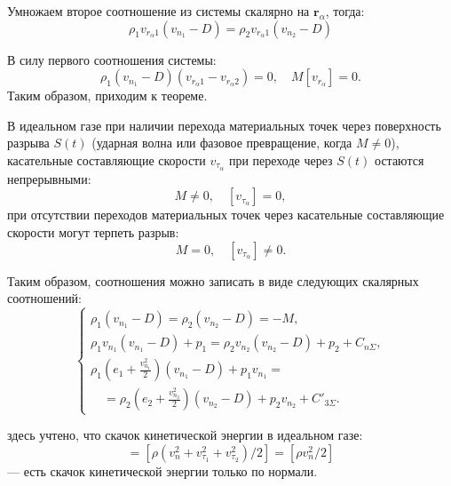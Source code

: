 Умножаем второе соотношение из системы скалярно на $\mathbf{r}_{\alpha}$, тогда:
\begin{equation*}
	\rho_1 v_{r_\alpha 1} \left(v_{n_1} - D\right) = \rho_2 v_{r_{\alpha} 1} \left(v_{n_2} - D\right)
\end{equation*}

В силу первого соотношения системы:
\begin{equation*}
	\rho_1 \left(v_{n_1} - D\right)\left(v_{r_\alpha 1} - v_{r_\alpha 2}\right) = 0, \quad M[v_{r_\alpha}] = 0.
\end{equation*}
Таким образом, приходим к теореме.

\begin{theorem}
	В идеальном газе при наличии перехода материальных точек через поверхность разрыва $S(t)$ (ударная волна или фазовое превращение, когда $M \not = 0$), касательные составляющие скорости $v_{\tau_\alpha}$ при переходе через $S(t)$ остаются непрерывными:
	\begin{equation*}
		M \not = 0, \quad [v_{\tau_\alpha}] = 0,
	\end{equation*}
	при отсутствии переходов материальных точек через касательные составляющие скорости могут терпеть разрыв:
	\begin{equation*}
		M = 0, \quad [v_{\tau_\alpha}] \not = 0.
	\end{equation*}
\end{theorem}

Таким образом, соотношения можно записать в виде следующих скалярных соотношений:
\begin{equation}
	\begin{cases}
		\rho_1 \left(v_{n_1} - D\right) = \rho_2 \left(v_{n_2} - D\right) = -M, \\
		\rho_1 v_{n_1} \left(v_{n_1} - D\right) + p_1 = \rho_2 v_{n_2} \left(v_{n_2} - D\right) + p_2 + C_{n\Sigma}, \\
		\rho_1 \left(e_1 + \frac{v_{n_1}^2}{2}\right) \left(v_{n_1} - D\right) + p_1 v_{n_1} = \\
		\quad = \rho_2 \left(e_2 + \frac{v_{n_2}^2}{2}\right) \left(v_{n_2} - D\right) + p_2 v_{n_2} + C'_{3\Sigma}.
	\end{cases} \label{3}
\end{equation}

здесь учтено, что скачок кинетической энергии в идеальном газе:
\begin{equation*}
	[\rho\abs{\mathbf{v}} / 2] = [\rho \left(v^2_n + v^2_{\tau_1} + v^2_{\tau_2}\right) / 2] = [\rho v^2_n / 2]
\end{equation*}
--- есть скачок кинетической энергии только по нормали. 

